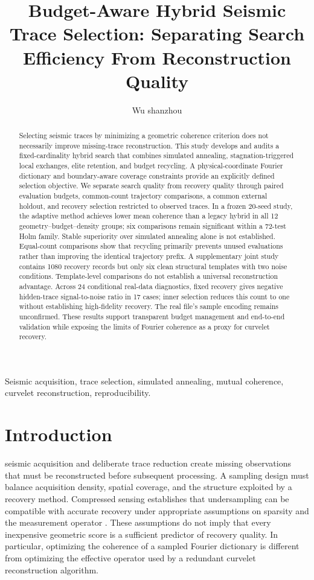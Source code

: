 \documentclass[journal]{IEEEtran}
\title{Budget-Aware Hybrid Seismic Trace Selection: Separating Search Efficiency From Reconstruction Quality}
\author{Wu shanzhou}
\begin{document}

\maketitle
\begin{abstract}
Selecting seismic traces by minimizing a geometric coherence criterion does not necessarily improve missing-trace reconstruction. This study develops and audits a fixed-cardinality hybrid search that combines simulated annealing, stagnation-triggered local exchanges, elite retention, and budget recycling. A physical-coordinate Fourier dictionary and boundary-aware coverage constraints provide an explicitly defined selection objective. We separate search quality from recovery quality through paired evaluation budgets, common-count trajectory comparisons, a common external holdout, and recovery selection restricted to observed traces. In a frozen 20-seed study, the adaptive method achieves lower mean coherence than a legacy hybrid in all 12 geometry--budget--density groups; six comparisons remain significant within a 72-test Holm family. Stable superiority over simulated annealing alone is not established. Equal-count comparisons show that recycling primarily prevents unused evaluations rather than improving the identical trajectory prefix. A supplementary joint study contains 1080 recovery records but only six clean structural templates with two noise conditions. Template-level comparisons do not establish a universal reconstruction advantage. Across 24 conditional real-data diagnostics, fixed recovery gives negative hidden-trace signal-to-noise ratio in 17 cases; inner selection reduces this count to one without establishing high-fidelity recovery. The real file's sample encoding remains unconfirmed. These results support transparent budget management and end-to-end validation while exposing the limits of Fourier coherence as a proxy for curvelet recovery.
\end{abstract}
\begin{IEEEkeywords}
Seismic acquisition, trace selection, simulated annealing, mutual coherence, curvelet reconstruction, reproducibility.
\end{IEEEkeywords}

\section{Introduction}
 seismic acquisition and deliberate trace reduction create missing observations that must be reconstructed before subsequent processing. A sampling design must balance acquisition density, spatial coverage, and the structure exploited by a recovery method. Compressed sensing establishes that undersampling can be compatible with accurate recovery under appropriate assumptions on sparsity and the measurement operator \cite{donoho,candes}. These assumptions do not imply that every inexpensive geometric score is a sufficient predictor of recovery quality. In particular, optimizing the coherence of a sampled Fourier dictionary is different from optimizing the effective operator used by a redundant curvelet reconstruction algorithm.
\end{document}
